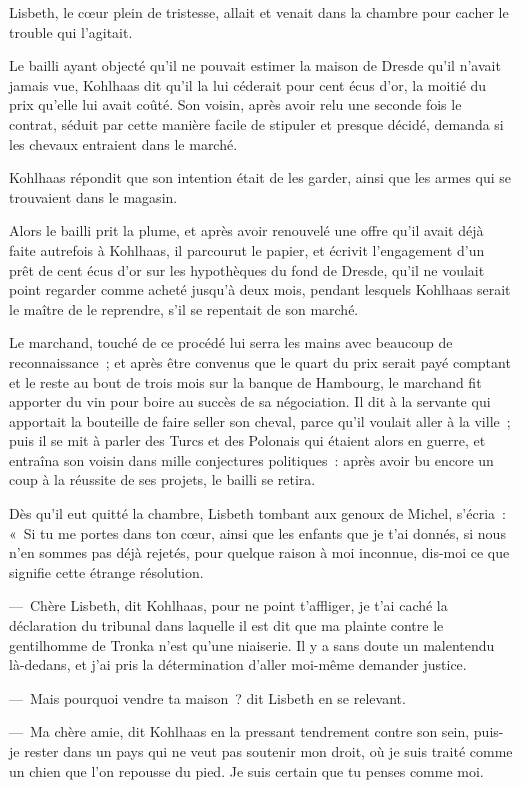 \documentclass[french,twoside]{book} %
\begin{document}
Lisbeth, le cœur plein de tristesse, allait et venait dans la chambre pour cacher le trouble qui l’agitait.\par
Le bailli ayant objecté qu’il ne pouvait estimer la maison de Dresde qu’il n’avait jamais vue, Kohlhaas dit qu’il la lui céderait pour cent écus d’or, la moitié du prix qu’elle lui avait coûté. Son voisin, après avoir relu une seconde fois le contrat, séduit par cette manière facile de stipuler et presque décidé, demanda si les chevaux entraient dans le marché.\par
Kohlhaas répondit que son intention était de les garder, ainsi que les armes qui se trouvaient dans le magasin.\par
Alors le bailli prit la plume, et après avoir renouvelé une offre qu’il avait déjà faite autrefois à Kohlhaas, il parcourut le papier, et écrivit l’engagement d’un prêt de cent écus d’or sur les hypothèques du fond de Dresde, qu’il ne voulait point regarder comme acheté jusqu’à deux mois, pendant lesquels Kohlhaas serait le maître de le reprendre, s’il se repentait de son marché.\par
Le marchand, touché de ce procédé lui serra les mains avec beaucoup de reconnaissance ; et après être convenus que le quart du prix serait payé comptant et le reste au bout de trois mois sur la banque de Hambourg, le marchand fit apporter du vin pour boire au succès de sa négociation. Il dit à la servante qui apportait la bouteille de faire seller son cheval, parce qu’il voulait aller à la ville ; puis il se mit à parler des Turcs et des Polonais qui étaient alors en guerre, et entraîna son voisin dans mille conjectures politiques : après avoir bu encore un coup à la réussite de ses projets, le bailli se retira.\par
Dès qu’il eut quitté la chambre, Lisbeth tombant aux genoux de Michel, s’écria : « Si tu me portes dans ton cœur, ainsi que les enfants que je t’ai donnés, si nous n’en sommes pas déjà rejetés, pour quelque raison à moi inconnue, dis-moi ce que signifie cette étrange résolution.\par
— Chère Lisbeth, dit Kohlhaas, pour ne point t’affliger, je t’ai caché la déclaration du tribunal dans laquelle il est dit que ma plainte contre le gentilhomme de Tronka n’est qu’une niaiserie. Il y a sans doute un malentendu là-dedans, et j’ai pris la détermination d’aller moi-même demander justice.\par
— Mais pourquoi vendre ta maison ? dit Lisbeth en se relevant.\par
— Ma chère amie, dit Kohlhaas en la pressant tendrement contre son sein, puis-je rester dans un pays qui ne veut pas soutenir mon droit, où je suis traité comme un chien que l’on repousse du pied. Je suis certain que tu penses comme moi.\par
\end{document}
